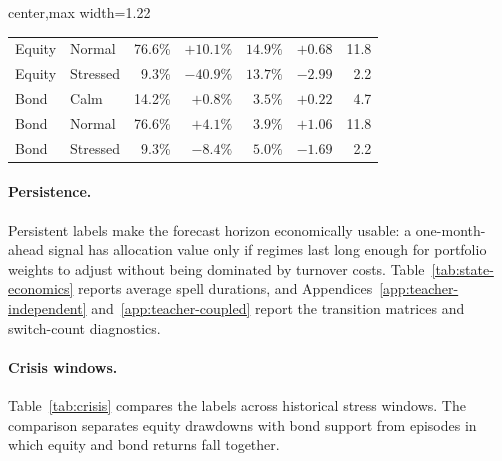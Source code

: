 \documentclass[10pt]{article}
\begin{document}
\begin{table}[H]
\begin{adjustbox}{center,max width=1.22\textwidth}
\begin{minipage}[t]{0.57\textwidth}
\begin{tabular}{@{}llrrrrr@{}}
                Equity & Normal   & 76.6\%           & $+10.1\%$ & $14.9\%$ & $+0.68$ & 11.8           \\
                Equity & Stressed & \phantom{0}9.3\% & $-40.9\%$ & $13.7\%$ & $-2.99$ & \phantom{0}2.2 \\
                Bond   & Calm     & 14.2\%           & $+0.8\%$  & $3.5\%$  & $+0.22$ & \phantom{0}4.7 \\
                Bond   & Normal   & 76.6\%           & $+4.1\%$  & $3.9\%$  & $+1.06$ & 11.8           \\
                Bond   & Stressed & \phantom{0}9.3\% & $-8.4\%$  & $5.0\%$  & $-1.69$ & \phantom{0}2.2 \\
                \bottomrule
            \end{tabular}{}
        \end{minipage}
    \end{adjustbox}
\end{table}

\paragraph{Persistence.}
Persistent labels make the forecast horizon economically usable: a one-month-ahead signal has
allocation value only if regimes last long enough for portfolio weights to adjust without
being dominated by turnover costs. Table~\ref{tab:state-economics} reports average spell
durations, and Appendices~\ref{app:teacher-independent} and~\ref{app:teacher-coupled} report
the transition matrices and switch-count diagnostics.

\paragraph{Crisis windows.}
Table~\ref{tab:crisis} compares the labels across historical stress windows. The comparison
separates equity drawdowns with bond support from episodes in which equity and bond returns
fall together.
\end{document}
